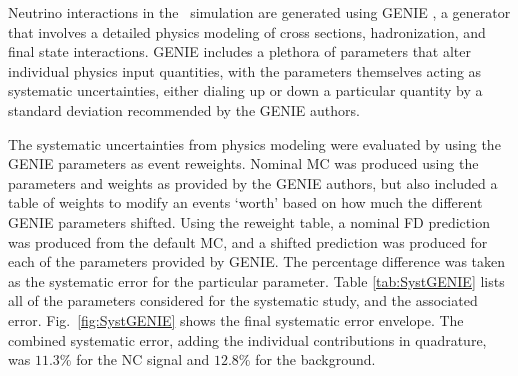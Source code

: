 \begin{doublespace}
Neutrino interactions in the \nova~simulation are generated using GENIE \cite{ref:GENIE}, a generator that involves a detailed physics modeling of cross sections, hadronization, and final state interactions. GENIE includes a plethora of parameters that alter individual physics input quantities, with the parameters themselves acting as systematic uncertainties, either dialing up or down a particular quantity by a standard deviation recommended by the GENIE authors.

The systematic uncertainties from physics modeling were evaluated by using the GENIE parameters as event reweights. Nominal MC was produced using the parameters and weights as provided by the GENIE authors, but also included a table of weights to modify an events `worth' based on how much the different GENIE parameters shifted. Using the reweight table, a nominal FD prediction was produced from the default MC, and a shifted prediction was produced for each of the parameters provided by GENIE. The percentage difference was taken as the systematic error for the particular parameter. Table \ref{tab:SystGENIE} lists all of the parameters considered for the systematic study, and the associated error. Fig.~\ref{fig:SystGENIE} shows the final systematic error envelope. The combined systematic error, adding the individual contributions in quadrature, was $11.3\%$ for the NC signal and $12.8\%$ for the background.


\end{doublespace}
